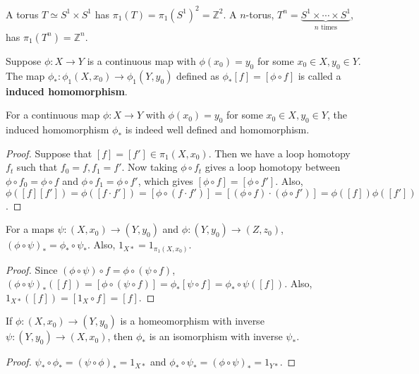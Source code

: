 \begin{exmp} A torus $T\simeq S^1\times S^1$ has $\pi_1(T)=\pi_1(S^1)^2=\mathbb{Z}^2$. A $n$-torus, $T^n=\underbrace{S^1\times \cdots\times S^1}_{n \textrm{ times}}$, has $\pi_1(T^n)=\mathbb{Z}^n$.
\end{exmp}

\begin{defn} Suppose $\phi:X\rightarrow Y$ is a continuous map with $\phi(x_0)=y_0$ for some $x_0\in X, y_0\in Y$. The map $\phi_*:\phi_1(X,x_0)\rightarrow \phi_1(Y,y_0)$ defined as $\phi_*[f]=[\phi\circ f]$ is called a \textbf{induced homomorphism}.
\end{defn}

\begin{prop} For a continuous map $\phi:X\rightarrow Y$ with $\phi(x_0)=y_0$ for some $x_0\in X, y_0\in Y$, the induced homomorphism $\phi_*$ is indeed well defined and homomorphism.
\end{prop}
\begin{proof}
Suppose that $[f]=[f']\in \pi_1(X,x_0)$. Then we have a loop homotopy $f_t$ such that $f_0=f,f_1=f'$. Now taking $\phi\circ f_t$ gives a loop homotopy between $\phi\circ f_0=\phi\circ f$ and $\phi\circ f_1=\phi\circ f'$, which gives $[\phi\circ f]=[\phi\circ f']$. Also, $\phi([f][f'])=\phi([f\cdot f'])=[\phi\circ(f\cdot f')]=[(\phi\circ f)\cdot (\phi\circ f')]=\phi([f])\phi([f'])$.
\end{proof}

\begin{prop} For a maps $\psi:(X,x_0)\rightarrow (Y,y_0)$ and $\phi:(Y,y_0)\rightarrow (Z,z_0)$, $(\phi\circ \psi)_*=\phi_*\circ \psi_*$. Also, $1_{X*}=1_{\pi_1(X,x_0)}$.
\end{prop}
\begin{proof}
Since $(\phi\circ\psi)\circ f=\phi\circ(\psi\circ f)$, $(\phi\circ \psi)_*([f])=[\phi\circ(\psi\circ f)]=\phi_*[\psi\circ f]=\phi_*\circ\psi([f])$. Also, $1_{X*}([f])=[1_X\circ f]=[f]$.
\end{proof}

\begin{cor} If $\phi:(X,x_0)\rightarrow (Y,y_0)$ is a homeomorphism with inverse $\psi:(Y,y_0)\rightarrow (X,x_0)$, then $\phi_*$ is an isomorphism with inverse $\psi_*$.
\end{cor}
\begin{proof}
$\psi_*\circ \phi_*=(\psi\circ\phi)_*=1_{X*}$ and $\phi_*\circ \psi_*=(\phi\circ \psi)_*=1_{Y*}$.
\end{proof}

